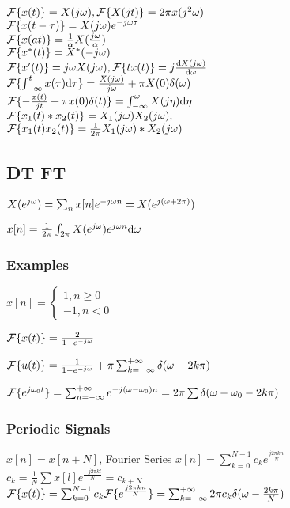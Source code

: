 $\mathcal{F}\{x(t)\} = X(j\omega), \mathcal{F}\{X(jt)\} = 2\pi x(j^2\omega)$\\
$\mathcal{F}\{x(t-\tau)\} = X(j\omega) e^{-j\omega\tau}$\\
$\mathcal{F}\{x(at)\} = \frac{1}{\alpha}X(\frac{j\omega}{\alpha})$\\
$\mathcal{F}\{x^*(t)\} = X^*(-j\omega)$\\
$\mathcal{F}\{x'(t)\} = j\omega X(j\omega), \mathcal{F}\{tx(t)\} = j\frac{\mathrm{d} X(j\omega)}{\mathrm{d} \omega}$\\
$\mathcal{F}\{\int_{-\infty}^{t} x(\tau) \mathrm{d} \tau\} = \frac{X(j\omega)}{j\omega} +\pi X(0)\delta(\omega)$\\
$\mathcal{F}\{-\frac{x(t)}{jt} +\pi x(0)\delta(t)\} = \int_{-\infty}^{\omega} X(j\eta) \mathrm{d} \eta$\\
$\mathcal{F}\{x_1(t)*x_2(t)\} = X_1(j\omega) X_2(j\omega),$\\
$\mathcal{F}\{x_1(t)x_2(t)\} = \frac{1}{2\pi}X_1(j\omega) * X_2(j\omega)$
\subsection{DT FT}

$X(e^{j\omega}) = \sum_n x[n] e^{-j\omega n} = X(e^{j(\omega + 2\pi)})$

$x[n] = \frac{1}{2\pi} \int_{2\pi} X(e^{j\omega}) e^{j\omega n} \mathrm{d} \omega$

\subsubsection*{Examples}

$x[n] = \begin{cases} 1, n\ge 0\\-1, n<0\end{cases}$

$\mathcal{F}\{x(t)\}=\frac{2}{1-e^{-j\omega}}$

$\mathcal{F}\{u(t)\}=\frac{1}{1-e^{-j\omega}} + \pi\sum_{k=-\infty}^{+\infty} \delta(\omega - 2k\pi)$

$\mathcal{F}\{e^{j\omega_0t}\} = \sum_{n=-\infty}^{+\infty} e^{-j(\omega-\omega_0)n} = 2\pi\sum \delta(\omega-\omega_0-2k\pi)$

\subsubsection*{Periodic Signals}

$x[n] = x[n+N]$, Fourier Series $x[n] = \sum_{k=0}^{N-1} c_k e^{\frac{j2\pi k n}{N}}$\\
$c_k = \frac{1}{N} \sum x[l] e^{\frac{-j2\pi k l}{N}} = c_{k + N}$\\
$\mathcal{F}\{x(t)\} = \sum_{k = 0}^{N - 1} c_k\mathcal{F}\{e^{\frac{j2\pi kn}{N}}\}=\sum_{k=-\infty}^{+\infty} 2\pi c_k\delta(\omega-\frac{2k\pi}{N})$

